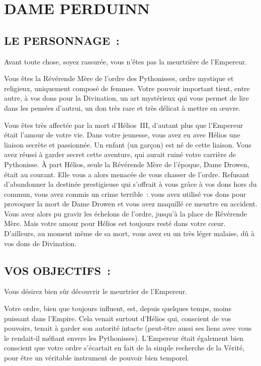 \documentclass[14pt,twocolumn]{extarticle}
\begin{document}
\section{DAME PERDUINN}

\subsection{LE PERSONNAGE~:}

Avant toute chose, soyez rassurée, vous n'êtes pas la meurtrière de l'Empereur.

Vous êtes la Révérende Mère de l'ordre des Pythonisses, ordre mystique et
religieux, uniquement composé de femmes. Votre pouvoir important tient, entre
autre, à vos dons pour la Divination, un art mystérieux qui vous permet de lire
dans les pensées d'autrui, un don très rare et très délicat à mettre en œuvre.

Vous êtes très affectée par la mort d'Hélios~III, d'autant plus que l'Empereur
était l'amour de votre vie. Dans votre jeunesse, vous avez eu avec Hélios une
liaison secrète et passionnée. Un enfant (un garçon) est né de cette liaison.
Vous avez réussi à garder secret cette aventure, qui aurait ruiné votre
carrière de Pythonisse. À part Hélios, seule la Révérende Mère de l'époque,
Dame Drowen, était au courant. Elle vous a alors menacée de vous chasser de
l'ordre. Refusant d'abandonner la destinée prestigieuse qui s'offrait à vous
grâce à vos dons hors du commun, vous avez commis un crime terrible~: vous avez
utilisé vos dons pour provoquer la mort de Dame Drowen et vous avez maquillé
ce meurtre en accident. Vous avez alors pu gravir les échelons de l'ordre,
jusqu'à la place de Révérende Mère. Mais votre amour pour Hélios est toujours
resté dans votre c\oe{}ur. D'ailleurs, au moment même de sa mort, vous avez eu
un très léger malaise, dû à vos dons de Divination.

\subsection{VOS OBJECTIFS~:}

Vous désirez bien sûr découvrir le meurtrier de l'Empereur.

Votre ordre, bien que toujours influent, est, depuis quelques temps, moins
puissant dans l'Empire. Cela venait surtout d'Hélios qui, conscient de vos
pouvoirs, tenait à garder son autorité intacte (peut-être aussi ses liens avec
vous le rendait-il méfiant envers les Pythonisses). L'Empereur était également
bien conscient que votre ordre s'écartait en fait de la simple recherche de la
Vérité, pour être un véritable instrument de pouvoir bien temporel.
\end{document}
